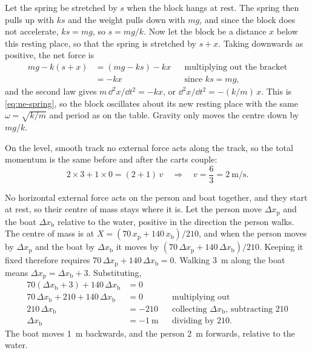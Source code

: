 Let the spring be stretched by $s$ when the
block hangs at rest. The spring then pulls up with $ks$ and the weight
pulls down with $mg$, and since the block does not accelerate, $ks = mg$,
so $s = mg/k$. Now let the block be a distance $x$ below this resting
place, so that the spring is stretched by $s + x$. Taking downwards as
positive, the net force is
\begin{align*}
   mg - k(s + x) &= (mg - ks) - kx
      && \text{multiplying out the bracket}\\
   &= -kx
      && \text{since $ks = mg$,}
\end{align*}
and the second law gives $m\,\dd^2 x/\dd t^2 = -kx$, or $\dd^2 x/\dd t^2 =
-(k/m)\,x$. This is \cref{eq:ne-spring}, so the block oscillates about its
new resting place with the same $\omega = \sqrt{k/m}$ and period as on the
table. Gravity only moves the centre down by $mg/k$.

On the level, smooth track no external force
acts along the track, so the total momentum is the same before and after
the carts couple:
\begin{equation*}
   2\times3 + 1\times0 = (2 + 1)\,v
   \quad\Longrightarrow\quad
   v = \frac{6}{3} = \SI{2}{\metre\per\second} .
\end{equation*}

No horizontal external force acts on the person
and boat together, and they start at rest, so their centre of mass stays
where it is. Let the person move $\Delta x_{\mathrm p}$ and the boat
$\Delta x_{\mathrm b}$ relative to the water, positive in the direction
the person walks. The centre of mass is at $X = (70\,x_{\mathrm p} +
140\,x_{\mathrm b})/210$, and when the person moves by $\Delta
x_{\mathrm p}$ and the boat by $\Delta x_{\mathrm b}$ it moves by $(70\,
\Delta x_{\mathrm p} + 140\,\Delta x_{\mathrm b})/210$. Keeping it fixed
therefore requires $70\,\Delta x_{\mathrm p} + 140\,\Delta x_{\mathrm b} =
0$. Walking \SI{3}{\metre}
along the boat means $\Delta x_{\mathrm p} = \Delta x_{\mathrm b} + 3$.
Substituting,
\begin{align*}
   70(\Delta x_{\mathrm b} + 3) + 140\,\Delta x_{\mathrm b} &= 0\\
   70\,\Delta x_{\mathrm b} + 210 + 140\,\Delta x_{\mathrm b} &= 0
      && \text{multiplying out}\\
   210\,\Delta x_{\mathrm b} &= -210
      && \text{collecting $\Delta x_{\mathrm b}$, subtracting 210}\\
   \Delta x_{\mathrm b} &= \SI{-1}{\metre}
      && \text{dividing by 210.}
\end{align*}
The boat moves \SI{1}{\metre} backwards, and the person \SI{2}{\metre}
forwards, relative to the water.

